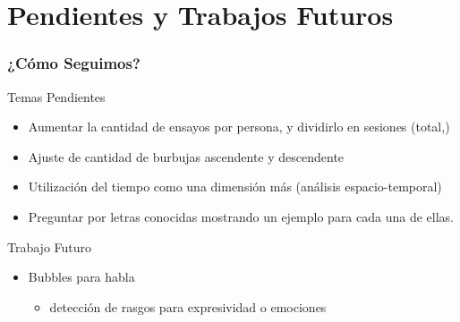 \documentclass[10pt]{beamer}
\begin{document}
  \section{Pendientes y Trabajos Futuros}
	\begin{frame}
	\frametitle{¿C\'omo Seguimos?}
	  \begin{block}{Temas Pendientes}
	    \begin{itemize}
		\item Aumentar la cantidad de ensayos por persona, y dividirlo en sesiones (total,)
		\item Ajuste de cantidad de burbujas ascendente y descendente
  		\item Utilización del tiempo como una dimensi\'on más (an\'alisis espacio-temporal)
		\item Preguntar por letras conocidas mostrando un ejemplo para cada una de ellas. 
	    \end{itemize}
	  \end{block} \pause

	  \begin{block}{Trabajo Futuro}
	   \begin{itemize}
		\item Bubbles para habla
		    \begin{itemize}
		      \item detección de rasgos para expresividad o emociones
		    \end{itemize}
	    \end{itemize}                     
	  \end{block}	    
	\end{frame}

\author[Christian, Miguel, Mail\'en]{Mail\'en G\'omez Mayol,\\Miguel Mart\'inez Soler,\\Christian Cossio Mercado}

\frame{\titlepage}

\appendix
\section{\appendixname}
\end{document}
